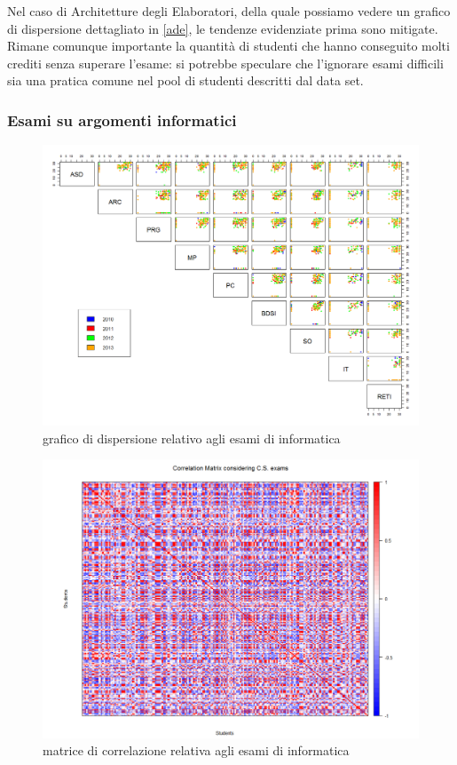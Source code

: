 Nel caso di Architetture degli Elaboratori, della quale possiamo vedere un grafico di dispersione dettagliato in \ref{ade}, le tendenze evidenziate prima sono mitigate. Rimane comunque importante la quantità di studenti che hanno conseguito molti crediti senza superare l’esame: si potrebbe speculare che l’ignorare esami difficili sia una pratica comune nel pool di studenti descritti dal data set.

\subsubsection{Esami su argomenti informatici}

\begin{figure}
    \centering
    \caption{grafico di dispersione relativo agli esami di informatica}
    \label{esami_inf}
	\includegraphics[scale=0.32]{img/scatter_plot_7_gen.png}
\end{figure}

\begin{figure}
    \centering
    \caption{matrice di correlazione relativa agli esami di informatica}
    \label{esami_inf_corr}
	\includegraphics[scale=0.32]{img/corr_matrix_2.png}
\end{figure}

